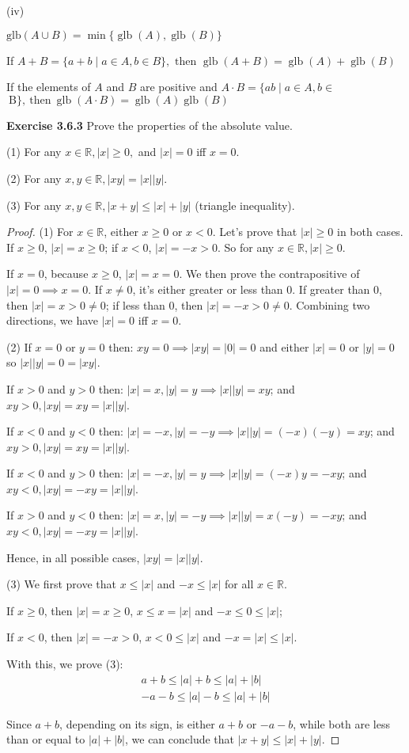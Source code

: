 \documentclass[12pt]{article}
\newcommand{\bbR}{\mathbb{R}}
\theoremstyle{definition}
\numberwithin{equation}{subsection}
\begin{document}
(iv)

    $\text{glb} (A \cup B)=\min \{\operatorname{glb}(A), \operatorname{glb}(B)\} $

    If $A+B=\{a+b \mid a \in A, b \in B\}, \text { then } \operatorname{glb}(A+B)=\operatorname{glb}(A)+ \operatorname{glb}(B) $

    If the elements of $A$ and $B$ are positive and $A \cdot B=\{a b \mid a \in A, b \in$
    $\mathrm{~ B \} , ~ t h e n ~} \operatorname{glb}(A \cdot B)=\operatorname{glb}(A) \operatorname{glb}(B)$

\bigskip


\textbf{Exercise 3.6.3} Prove the properties of the absolute value.

(1) For any $x \in \mathbb{R},|x| \geq 0,$ and $|x|=0$ iff $x=0$.

(2) For any $x, y \in \mathbb{R},|x y|=|x||y|$.

(3) For any $x, y \in \mathbb{R},|x+y| \leq|x|+|y|$ (triangle inequality).


\begin{proof}
(1) For $x \in \bbR$, either $x \geq 0$ or $x < 0$. Let's prove that $|x| \geq 0$ in both cases. If $x \geq 0$, $|x| = x \geq 0$; if $x < 0$, $|x| = -x > 0$. So for any  $x \in \mathbb{R},|x| \geq 0$.

If $x=0$, because $x\geq 0$, $|x|=x =0$. We then prove the contrapositive of $|x|=0\implies x=0$. If $x\neq 0$, it's either greater or less than 0. If greater than 0, then $|x|=x>0\neq 0$; if less than 0, then $|x|=-x>0\neq 0$. Combining two directions, we have $|x|=0$ iff $x=0$.

\bigskip
(2)
If $x=0$ or $y=0$
then:
$
xy=0 \implies |xy|=|0|=0
$
and either $|x|=0$ or $|y|=0$ so
$
|x||y|=0=|xy|
$.

If $x>0$ and $y>0$
then:
$|x| =x, |y| =y \implies |x||y| =x y $;
and
$xy>0, |xy|=xy = |x||y|$.

If $x<0$ and $y<0$
then:
$|x| =-x, |y| =-y \implies |x||y| =(-x)(-y)=xy $;
and
$xy>0, |xy|=xy = |x||y|$.

If $x<0$ and $y>0$
then:
$|x| =-x, |y| =y \implies |x||y| =(-x)y=-xy $;
and
$xy<0, |xy|=-xy = |x||y|$.

If $x>0$ and $y<0$
then:
$|x| =x, |y| =-y \implies |x||y| =x(-y)=-xy $;
and
$xy<0, |xy|=-xy = |x||y|$.

Hence, in all possible cases, $|xy|=|x||y|$.

\bigskip
(3) We first prove that $x\leq|x|$ and $-x\leq|x|$ for all $x\in \bbR$.

If $x\geq 0$, then $|x|=x\geq 0$, $x\leq x=|x|$ and $-x\leq 0 \leq|x|$;

If $x < 0$, then $|x|=-x > 0$, $x < 0 \leq|x|$ and $-x = |x| \leq|x|$.

With this, we prove (3):
$$
\begin{aligned} a+b \leq|a|+b \leq|a|+|b| \\-a-b \leq|a|-b \leq|a|+|b| \end{aligned}
$$

Since $a+b$, depending on its sign, is either $a+b$ or $-a-b$, while both are less than or equal to $|a|+|b|$, we can conclude that $|x+y| \leq|x|+|y|$.
\end{proof}
\end{document}
